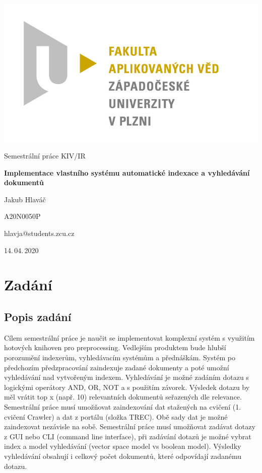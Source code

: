 \documentclass[
12pt,
a4paper,
pdftex,
czech,
titlepage
]{report}
\begin{document}
\begin{titlepage}
	\vspace*{-2cm}
	{\centering\includegraphics[scale=0.3]{img/FAV_logo_jvs.jpg}\par}
	\centering
	\vspace*{2cm}
	{\Large Semestrální práce KIV/IR\par}
	\vspace{1.5cm}
	{\Huge\bfseries Implementace vlastního systému automatické indexace a vyhledávání dokumentů\par}
	\vspace{2cm}

	{\Large Jakub Hlaváč\par}
	{\Large A20N0050P\par}
	{\Large hlavja@students.zcu.cz\par}

	\vfill

	{\Large 14.\,04.\,2020}
\end{titlepage}

\tableofcontents
\thispagestyle{empty}
\clearpage

\chapter{Zadání}
\section{Popis zadání}
Cílem semestrální práce je naučit se implementovat komplexní systém s využitím hotových knihoven pro preprocessing. Vedlejším produktem bude hlubší porozumění indexerům, vyhledávacím systémům a přednáškám.
Systém po předchozím předzpracování zaindexuje zadané dokumenty a poté umožní vyhledávání nad vytvořeným indexem. Vyhledávání je možné zadáním dotazu s logickými operátory AND, OR, NOT a s použitím závorek. Výsledek dotazu by měl vrátit top x (např. 10) relevantních dokumentů seřazených dle relevance.
Semestrální práce musí umožňovat zaindexování dat stažených na cvičení (1. cvičení Crawler) a dat z portálu (složka TREC). Obě sady dat je možné zaindexovat nezávisle na sobě.
Semestrální práce musí umožňovat zadávat dotazy z GUI nebo CLI (command line interface), při zadávání dotazů je možné vybrat index a model vyhledávání (vector space model vs boolean model). Výsledky vyhledávání obsahují i celkový počet dokumentů, které odpovídají zadanému dotazu.
\label{minzadani}
\end{document}
